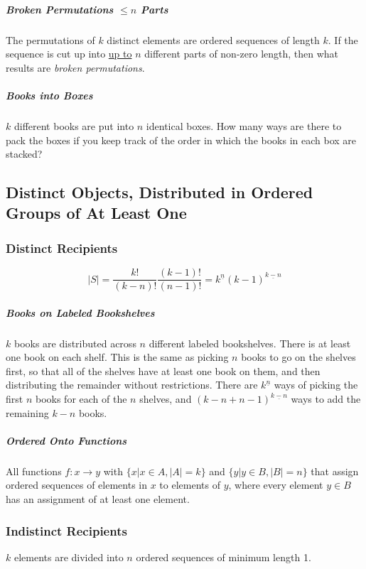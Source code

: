 \subparagraph{Broken Permutations $\leq n$ Parts} The permutations of $k$ distinct elements are ordered sequences of length $k$. If the sequence is cut up into \underline{up to} $n$ different parts of non-zero length, then what results are \textit{broken permutations}.

\subparagraph{Books into Boxes} $k$ different books are put into $n$ identical boxes. How many ways are there to pack the boxes if you keep track of the order in which the books in each box are stacked? 


\subsection{Distinct Objects, Distributed in Ordered Groups of At Least One}

\subsubsection{Distinct Recipients}

\begin{equation}
|S| = \frac{k!}{(k-n)!}\frac{(k-1)!}{(n-1)!} = k^{\underline{n}} (k-1)^{\underline{k-n}}
\end{equation}

\subparagraph{Books on Labeled Bookshelves} $k$ books are distributed across $n$ different labeled bookshelves. There is at least one book on each shelf. This is the same as picking $n$ books to go on the shelves first, so that all of the shelves have at least one book on them, and then distributing the remainder without restrictions. There are $k^{\underline{n}}$ ways of picking the first $n$ books for each of the $n$ shelves, and $(k-n+n-1)^{\underline{k-n}}$ ways to add the remaining $k-n$ books. 

\subparagraph{Ordered Onto Functions} All functions $f: x \rightarrow y$ with $\{x | x\in A, |A| = k \}$ and $\{y | y\in B, |B| = n\}$ that assign ordered sequences of elements in $x$ to elements of $y$, where every element $y\in B$ has an assignment of at least one element.

\subsubsection{Indistinct Recipients}
$k$ elements are divided into $n$ ordered sequences of minimum length 1.

